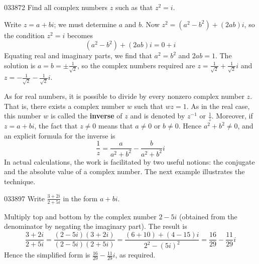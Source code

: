 \begin{example}{}{033872}
Find all complex numbers $z$ such as that $z^{2} = i$.


\begin{solution}
  Write $z = a + bi$; we must determine $a$ and $b$. Now $z^{2} = (a^{2} - b^{2}) + (2ab)i$, so the condition $z^{2} = i$ becomes
\begin{equation*}
(a^2 - b^2) + (2ab)i = 0+i
\end{equation*}
Equating real and imaginary parts, we find that $a^{2} = b^{2}$ and $2ab = 1$. The solution is $a = b = \pm \frac{1}{\sqrt{2}}$, so the complex numbers required are $z = \frac{1}{\sqrt{2}} + \frac{1}{\sqrt{2}}i$  and  $z = -\frac{1}{\sqrt{2}} - \frac{1}{\sqrt{2}}i$.
\end{solution}
\end{example}

As for real numbers, it is possible to divide by every nonzero complex number $z$. That is, there exists a complex number $w$ such that $wz = 1$. As in the real case, this number $w$ is called the \textbf{inverse} of $z$ and is denoted by $z^{-1}$ or $\frac{1}{z}$. Moreover, if $z = a + bi$, the fact that $z \neq 0$ means that $a \neq 0$ or $b \neq 0$. Hence $a^{2} + b^{2} \neq 0$, and an explicit formula for the inverse is
\begin{equation*}
\frac{1}{z} = \frac{a}{a^2 + b^2} - \frac{b}{a^2+b^2}{i}
\end{equation*}
In actual calculations, the work is 
facilitated by two useful notions: the conjugate and the absolute value 
of a complex number. The next example illustrates the technique.

\newpage

\begin{example}{}{033897}
Write $\frac{3+2i}{2+5i}$ in the form $a + bi$.


\begin{solution}
  Multiply top and bottom by the complex number $2 - 5i$ (obtained from the denominator by negating the imaginary part). The result is
\begin{equation*}
\frac{3+2i}{2+5i} = \frac{(2-5i)(3+2i)}{(2-5i)(2+5i)} = \frac{(6+10)+(4-15)i}{2^2-(5i)^2} = \frac{16}{29} - \frac{11}{29} i 
\end{equation*}
Hence the simplified form is $\frac{16}{29} - \frac{11}{29} i $, as required.
\end{solution}
\end{example}

